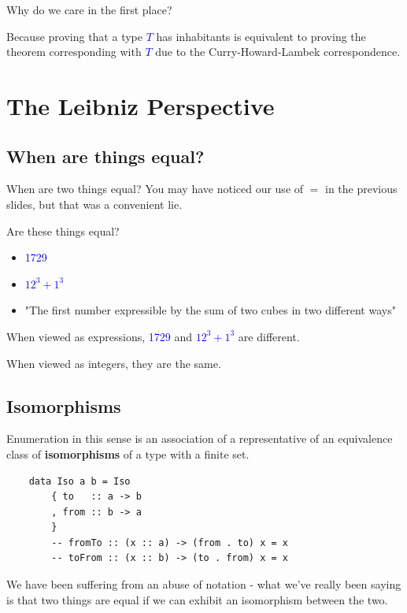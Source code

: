 \documentclass[tikz]{beamer}
\newcommand{\blue}[1]{\textcolor{blue}{#1}}
\newcommand{\mblue}[1]{\textcolor{blue}{$#1$}}
\theoremstyle{definition}
\begin{document}
\frame
{ 
	Why do we care in the first place? 
}

\frame
{ 
	Because proving that a type \mblue{T} has inhabitants is equivalent to proving the theorem corresponding with \mblue{T} due to the Curry-Howard-Lambek correspondence.
}



\section{The Leibniz Perspective}

\subsection{When are things equal?}
\frame
{
	When are two things equal? You may have noticed our use of $=$ in the previous slides, but that was a convenient lie.
}

\frame
{
	Are these things equal? 
	
	\begin{itemize}
		\item \blue{1729}
		\item \mblue{12^3 + 1^3}
		\item "The first number expressible by the sum of two cubes in two different ways"
	\end{itemize}
}

\frame
{
	When viewed as expressions, \blue{1729} and \mblue{12^3 + 1^3} are different.
}

\frame
{
	When viewed as integers, they are the same. 
}

\subsection{Isomorphisms}
\frame
{
	Enumeration in this sense is an association of a representative of an equivalence class of \textbf{isomorphisms} of a type with a finite set. 
}


\begin{frame}[fragile]

	\begin{verbatim}
	data Iso a b = Iso 
	    { to   :: a -> b
	    , from :: b -> a
	    }
	    -- fromTo :: (x :: a) -> (from . to) x = x
	    -- toFrom :: (x :: b) -> (to . from) x = x
	\end{verbatim}
\end{frame}

\frame
{
	We have been suffering from an abuse of notation - what we've really been saying is that two things are equal if we can exhibit an isomorphism between the two.
}
\end{document}
